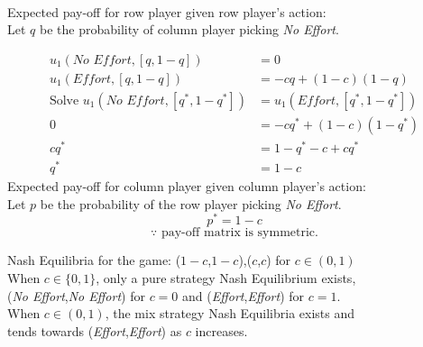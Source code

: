 \documentclass[12pt]{article}
\newenvironment{solution}[2][Solution]{\begin{trivlist}
\item[\hskip \labelsep {\bfseries #1}]}{\end{trivlist}}
\begin{document}
\begin{solution}{}~\\
Expected pay-off for row player given row player's action:\\
Let $q$ be the probability of column player picking \textit{No Effort}.

\begin{align*}
u_1(\textit{No Effort}, [q,1-q])&=0\\
u_1(\textit{Effort}, [q,1-q])&=-cq+(1-c)(1-q)\\
\text{Solve }u_1(\textit{No Effort}, [q^*,1-q^*])&=u_1(\textit{Effort}, [q^*,1-q^*])\\
0&=-cq^*+(1-c)(1-q^*)\\
cq^*&=1-q^*-c+cq^*\\
q^*&=1-c
\end{align*}
Expected pay-off for column player given column player's action:\\
Let $p$ be the probability of the row player picking \textit{No Effort}.
$$p^*=1-c$$
$$\because \text{ pay-off matrix is symmetric.}$$

Nash Equilibria for the game: ($1-c$,$1-c$),($c$,$c$) for $c\in(0,1)$\\

When $c\in\{0,1\}$, only a pure strategy Nash Equilibrium exists,\\
(\textit{No Effort},\textit{No Effort}) for $c=0$ and (\textit{Effort},\textit{Effort}) for $c=1$.\\

When $c\in(0,1)$, the mix strategy Nash Equilibria exists and \\
tends towards (\textit{Effort},\textit{Effort}) as $c$ increases.
\end{solution}
\end{document}
